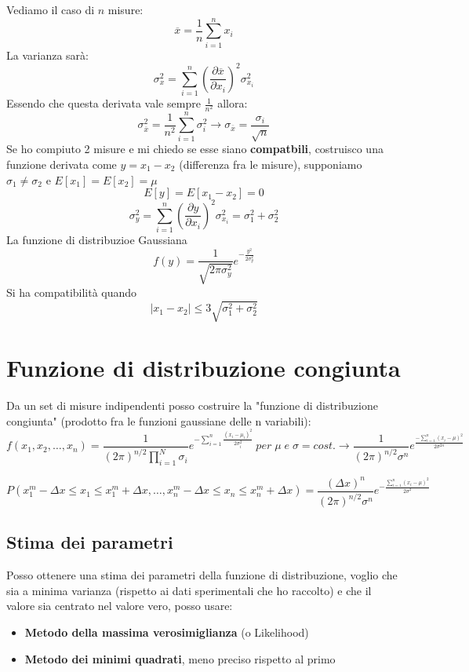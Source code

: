 \documentclass{article}
\begin{document}
\vspace{1cm}

Vediamo il caso di $n$ misure:
\[
\overline{x}=\frac{1}{n}\sum_{i=1}^n x_i
\]
La varianza sarà:
\[
\sigma_x^2=\sum_{i=1}^n \left(\frac{\partial \overline{x}}{\partial x_i}\right)^2 \sigma_{x_i}^2
\]
Essendo che questa derivata vale sempre $\frac{1}{n^2}$ allora:
\[
\sigma_{\overline{x}}^2=\frac{1}{n^2} \sum_{i=1}^n \sigma_i^2 \rightarrow \sigma_{\overline{x}}=\frac{\sigma_i }{\sqrt{n}}
\]
Se ho compiuto 2 misure e mi chiedo se esse siano \textbf{compatbili}, costruisco una funzione derivata come $y=x_1-x_2$ (differenza fra le misure), supponiamo $\sigma_1 \neq \sigma_2$ e $E[x_1]=E[x_2]=\mu$
\[
E[y]=E[x_1-x_2]=0
\]   
\[
\sigma_y^2=\sum_{i=1}^{n} \left(\frac{\partial y}{\partial x_i}\right)^2 \sigma_{x_i}^2=\sigma_1^2+\sigma_2^2
\]
La funzione di distribuzioe Gaussiana 
\[
f(y)=\frac{1}{\sqrt{2\pi \sigma_y^2}}e^{-\frac{y^2}{2\sigma_y^2}}
\]
Si ha compatibilità quando
\[
\left| x_1-x_2 \right| \leq 3\sqrt{{\sigma_1^2+\sigma_2^2}}
\]

\section{Funzione di distribuzione congiunta}
Da un set di misure indipendenti posso costruire la "funzione di distribuzione congiunta" (prodotto fra le funzioni gaussiane delle n variabili):
\begin{equation*}
    f(x_1, x_2, \ldots, x_n) = \frac{1}{(2\pi)^{n/2} \prod_{i=1}^{N}\sigma_i} e^{-\sum_{i=1}^n \frac{(x_i - \mu_i)^2}{2\sigma_i^2}} \: per \; \mu \; e \; \sigma=cost. \rightarrow \frac{1}{(2\pi)^{n/2} \sigma^n} e^{\frac{-\sum_{i=1}^n (x_i - \mu)^2}{2\sigma^{2n}}}
    \end{equation*}

    \begin{equation*}
        P(x_1^m - \Delta x \leq x_1 \leq x_1^m + \Delta x, \ldots, x_n^m - \Delta x \leq x_n \leq x_n^m + \Delta x) = \frac{(\Delta x)^n}{(2\pi)^{n/2} \sigma^n} e^{-\frac{\sum_{i=1}^n (x_i - \mu)^2}{2\sigma^2}}
        \end{equation*}

\subsection{Stima dei parametri}
Posso ottenere una stima dei parametri della funzione di distribuzione, voglio che sia a minima varianza (rispetto ai dati sperimentali che ho raccolto) e che il valore sia centrato nel valore vero, posso usare:
\begin{itemize}
    \item \textbf{Metodo della massima verosimiglianza} (o Likelihood)
    \item \textbf{Metodo dei minimi quadrati}, meno preciso rispetto al primo
\end{itemize}
\end{document}

